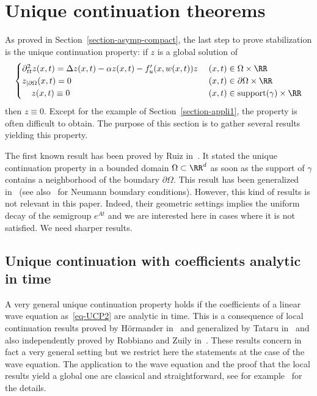 \section{Unique continuation theorems}\label{section-UCP}
As proved in Section~\ref{section-asymp-compact}, the last step to prove stabilization is the unique continuation property: if $z$ is a global solution of
\begin{equation}\label{eq-UCP2}
\begin{cases}
\partial_{tt}^2 z(x,t) = \Delta z(x,t) - \alpha z(x,t) - f'_u(x,w(x,t)) z\;&(x,t)\in\Omega\times\RR\\
z_{|\partial\Omega}(x,t)=0&(x,t)\in\partial\Omega\times \RR\\
\mkern20mu z(x,t)\equiv 0 & (x,t)\in \text{support}(\gamma)\times \RR
\end{cases}
\end{equation}
then $z\equiv 0$. Except for the example of Section~\ref{section-appli1}, the property is often difficult to obtain. The purpose of this section is to gather several results yielding this property.

The first known result has been proved by Ruiz in~\cite{Ruiz}. It stated the unique continuation property in a bounded domain $\Omega \subset\RR^d$ as soon as the support of $\gamma$ contains a neighborhood of the boundary $\partial\Omega$. This result has been generalized in~\cite{K-K} (see also~\cite{Las-Tri-Zha} for Neumann boundary conditions). However, this kind of results is not relevant in this paper. Indeed, their geometric settings implies the uniform decay of the semigroup $e^{At}$ and we are interested here in cases where it is not satisfied. We need sharper results.


\subsection{Unique continuation with coefficients analytic in time}

A very general unique continuation property holds if the coefficients of a linear wave equation as~\eqref{eq-UCP2} are analytic in time. This is a consequence of local continuation results proved by H\"ormander in~\cite{Hormander_uniq_analytic} and generalized by Tataru in~\cite{Tataru_uniq_analyticJMPA} and also independently proved by Robbiano and Zuily in~\cite{Rob-Zui}. These results concern in fact a very general setting but we restrict here the statements at the case of the wave equation. The application to the wave equation and the proof that the local results yield a global one are classical and straightforward, see for example~\cite[Corollary~3.2]{RC} for the details.

